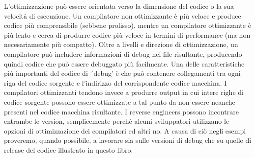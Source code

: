 L'ottimizzazione può essere orientata verso la dimensione del codice o la sua velocità di esecuzione.
Un compilatore non ottimizzante è più veloce e produce codice più comprensibile (sebbene prolisso), mentre un compilatore ottimizzante è più lento e cerca di produrre codice più veloce in termini di performance (ma non necesariamente più compatto).
Oltre a livelli e direzione di ottimizzazione, un compilatore può includere informazioni di debug nel file risultante, producendo quindi codice che può essere debuggato più facilmente.
Una delle caratteristiche più importanti del codice di ´debug' è che può contenere collegamenti tra ogni riga del codice sorgente e l'indirizzo del corrispondente codice macchina.
I compilatori ottimizzanti tendono invece a produrre output in cui intere righe di codice sorgente possono essere ottimizzate a tal punto da non essere neanche presenti nel codice macchina risultante.
I reverse engineers possono incontrare entrambe le version, semplicemente perchè alcuni sviluppatori utilizzano le opzioni di ottimizzazione dei compilatori ed altri no. A causa di ciò negli esempi proveremo, quando possibile, a lavorare sia sulle versioni di debug che su quelle di release del codice illustrato in questo libro.
